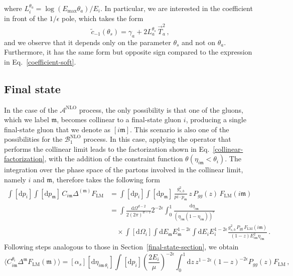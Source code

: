 \documentclass[a4paper, 12pt]{book}
\newcommand{\um}{\mathfrak{m}}
\begin{document}
where $L_i^{\theta_a}= \log{(E_{\mathrm{max}}\theta_a)/E_i}$. In particular, we are interested in the coefficient in front of the $1/\epsilon$ pole, which takes the form
\begin{equation}
    \tilde{c}_{-1}(\theta_s)= \gamma_a + 2 L_a^{\theta_s} \,\vec{T}_a^2 \, ,
    \label{coefficient-collinear-initial}
\end{equation}
and we observe that it depends only on the parameter $\theta_s$ and not on $\theta_a$. Furthermore, it has the same form but opposite sign compared to the expression in Eq.~\ref{coefficient-soft}.

\subsection{Final state}
In the case of the $\mathcal{A}^{\mathrm{NLO}}$ process, the only possibility is that one of the gluons, which we label $\um$, becomes collinear to a final-state gluon $i$, producing a single final-state gluon that we denote as $[i\um]$. This scenario is also one of the possibilities for the $\mathcal{B}_1^{\mathrm{NLO}}$ process. In this case, applying the operator that performs the collinear limit leads to the factorization shown in Eq.~\ref{collinear-factorization}, with the addition of the constraint function $\theta(\eta_{i\um}<\theta_i)$. The integration over the phase space of the partons involved in the collinear limit, namely $i$ and $\um$, therefore takes the following form
\begin{equation}
  \begin{aligned}
    \int [\mathrm{d}p_i] \int [\mathrm{d}p_\um] \, C_{i\um} \Delta^{(\um)} F_{\mathrm{LM}} & = \int [\mathrm{d}p_i] \int [\mathrm{d}p_\um] \, \frac{g^2_{s,b}}{pi \cdot p_\um} \, z \, P_{gg}(z) \, F_{\mathrm{LM}}(i \um) \\
    &= \int \frac{\mathrm{d}\Omega^{d-2}}{2(2\pi)^{d-1}} 2^{-2\epsilon} \int_0^1 \frac{\mathrm{d}\eta_{i\um}}{(\eta_{i\um}(1-\eta_{i\um}))^{\epsilon}} \nonumber \\
    &\quad \times \int [\mathrm{d}\Omega_i] \int \mathrm{d}E_\um E_\um^{1-2\epsilon} \int \mathrm{d}E_i E_i^{1-2\epsilon} \frac{g_{s,b}^2 \,  P_{gg} \, F_{\mathrm{LM}} (i\um) }{(1-z) E_{i\um}^{2}\eta_{i\um}} \, .
  \end{aligned}
\end{equation}
Following steps analogous to those in Section~\ref{final-state-section}, we obtain
\begin{equation}
  \langle C_{i\um}^{\theta_i} \Delta^\um F_{\mathrm{LM}} (\um) \rangle = [\alpha_s] [\mathrm{d}\eta_{i\um \, \theta_i}] \int [\mathrm{d}p_i] \left( \frac{2 E_i}{\mu}\right)^{-2 \epsilon} \int_0^1 \mathrm{d}z \, z^{1-2\epsilon} (1-z)^{-2\epsilon} P_{gg}(z) F_{\mathrm{LM}} \, ,
\end{equation}
\end{document}
